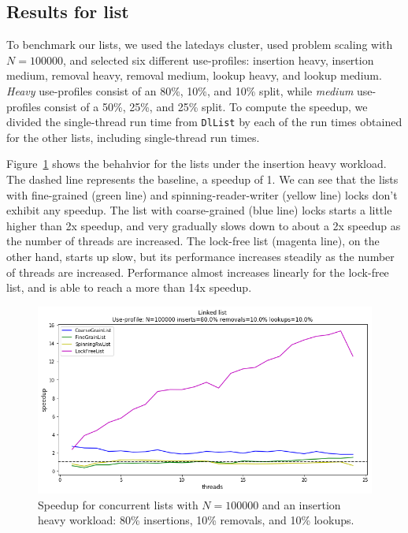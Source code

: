 \documentclass[11pt]{article}
\begin{document}
\subsection{Results for list}
To benchmark our lists, we used the latedays cluster, used problem scaling with
$N=100000$, and selected six different use-profiles: insertion heavy, insertion
medium, removal heavy, removal medium, lookup heavy, and lookup medium. {\it
Heavy} use-profiles consist of an 80\%, 10\%, and 10\% split, while {\it
medium} use-profiles consist of a 50\%, 25\%, and 25\% split. To compute the
speedup, we divided the single-thread run time from {\tt DlList} by each of the
run times obtained for the other lists, including single-thread run times.

Figure~\ref{fig:listInsertHeavy} shows the behahvior for the lists under the
insertion heavy workload. The dashed line represents the baseline, a speedup of
1. We can see that the lists with fine-grained (green line) and
spinning-reader-writer (yellow line) locks don't exhibit any speedup. The list
with coarse-grained (blue line) locks starts a little higher than 2x speedup,
and very gradually slows down to about a 2x speedup as the number of threads are
increased. The lock-free list (magenta line), on the other hand, starts up slow,
but its performance increases steadily as the number of threads are increased.
Performance almost increases linearly for the lock-free list, and is able to
reach a more than 14x speedup.

\begin{figure}[h]
\centering
\includegraphics[width=1.0\linewidth]{figs/lateday/combined/lateday_combined_list_insert_80_lookup_10_removal_10}
\caption{
Speedup for concurrent lists with $N=100000$ and an insertion heavy workload:
80\% insertions, 10\% removals, and 10\% lookups.}
\label{fig:listInsertHeavy}
\end{figure}
\end{document}
